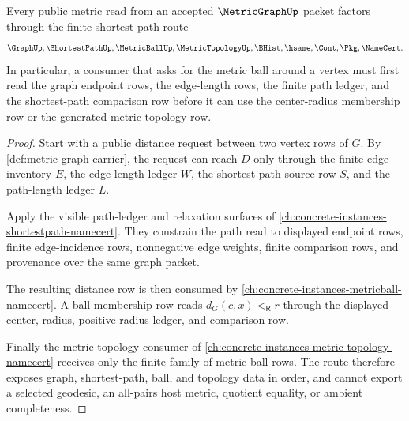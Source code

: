 \begin{theorem}
\label{thm:metric-graph-shortest-path-metric-route}
Every public metric read from an accepted $\MetricGraphUp$ packet factors through the finite shortest-path route
$$
\GraphUp,\ShortestPathUp,\MetricBallUp,\MetricTopologyUp,\BHist,\hsame,\Cont,\Pkg,\NameCert .
$$
In particular, a consumer that asks for the metric ball around a vertex must first read the graph endpoint rows, the edge-length rows, the finite path ledger, and the shortest-path comparison row before it can use the center-radius membership row or the generated metric topology row.
\end{theorem}
\begin{proof}
Start with a public distance request between two vertex rows of $G$. By \autoref{def:metric-graph-carrier}, the request can reach $D$ only through the finite edge inventory $E$, the edge-length ledger $W$, the shortest-path source row $S$, and the path-length ledger $L$.

Apply the visible path-ledger and relaxation surfaces of \autoref{ch:concrete-instances-shortestpath-namecert}. They constrain the path read to displayed endpoint rows, finite edge-incidence rows, nonnegative edge weights, finite comparison rows, and provenance over the same graph packet.

The resulting distance row is then consumed by \autoref{ch:concrete-instances-metricball-namecert}. A ball membership row reads $d_G(c,x)<_{\mathsf R}r$ through the displayed center, radius, positive-radius ledger, and comparison row.

Finally the metric-topology consumer of \autoref{ch:concrete-instances-metric-topology-namecert} receives only the finite family of metric-ball rows. The route therefore exposes graph, shortest-path, ball, and topology data in order, and cannot export a selected geodesic, an all-pairs host metric, quotient equality, or ambient completeness.
\end{proof}



